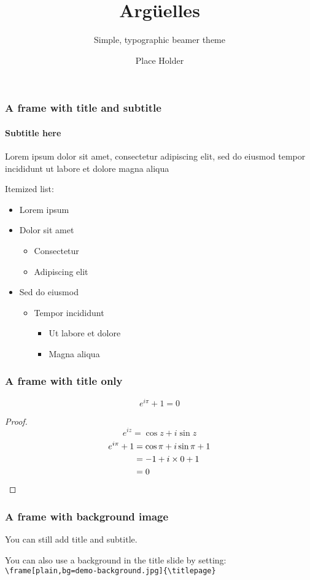 \documentclass[compress,12pt,aspectratio=169]{beamer}
\title{Argüelles}
\subtitle{Simple, typographic beamer theme}
\date{}
\author{Place Holder}
\institute{University of \TeX}
\begin{document}
\frame[plain]{\titlepage}


\begin{frame}
	\frametitle{A frame with title and subtitle}
	\framesubtitle{Subtitle here}
	Lorem ipsum dolor sit amet, consectetur adipiscing elit, sed do eiusmod tempor incididunt ut labore et dolore magna aliqua \par
	Itemized list:
	\begin{itemize}
		\item Lorem ipsum
		\item Dolor sit amet
		      \begin{itemize}
			      \item Consectetur
			      \item Adipiscing elit
		      \end{itemize}
		\item Sed do eiusmod
		      \begin{itemize}
			      \item Tempor incididunt
			            \begin{itemize}
				            \item Ut labore et dolore
				            \item Magna aliqua
			            \end{itemize}
		      \end{itemize}
	\end{itemize}
\end{frame}

\begin{frame}
	\frametitle{A frame with title only}
	\begin{theorem}
		\[e^{i\pi}+1=0\]
		\begin{proof}
			\begin{equation*}
				e^{iz}=\cos{z}+i\sin{z}
			\end{equation*}
			\begin{align*}
				e^{i\pi}+1 & \null=\cos\pi+i\sin\pi+1 \\
				           & \null=-1+i\times0+1      \\
				           & \null=0
			\end{align*}
		\end{proof}
	\end{theorem}
\end{frame}

\begin{frame}[bg=demo-arguelles.png]
	\frametitle{A frame with background image}
	You can still add title and subtitle. \par
	You can also use a background in the title slide by setting: \\
	\texttt{\textbackslash frame[plain,bg=demo-background.jpg]\{\textbackslash titlepage\}}
\end{frame}
\end{document}
